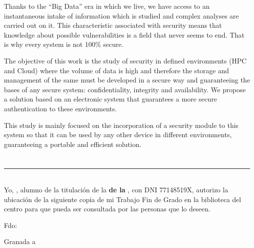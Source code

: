 Thanks to the ``Big Data'' era in which we live, we have access to an instantaneous intake of information which is studied and complex analyses are carried out on it. 
This characteristic associated with security means that knowledge about possible vulnerabilities is a field that never seems to end. That is why every system is not 100\% secure.

The objective of this work is the study of security in defined environments (HPC and Cloud) where the volume of data is high and therefore the storage and management of the same must be developed in a secure way and guaranteeing the bases of any secure system: confidentiality, integrity and availability.  We propose a solution based on an electronic system that guarantees a more secure authentication to these environments. 

This study is mainly focused on the incorporation of a security module to this system so that it can be used by any other device in different environments, guaranteeing a portable and efficient solution. 


\chapter*{}

\thispagestyle{empty}

\noindent\rule[-1ex]{\textwidth}{2pt}\\[4.5ex]

Yo, \textbf{\myName}, alumno de la titulación \myDegree de la \textbf{\myFaculty de la \myUni}, con DNI 77148519X, autorizo la
ubicación de la siguiente copia de mi Trabajo Fin de Grado en la biblioteca del centro para que pueda ser
consultada por las personas que lo deseen.

\vspace{6cm}

\noindent Fdo: \myName

\vspace{2cm}

\begin{flushright}
Granada a \myTime
\end{flushright}

\chapter*{}

\thispagestyle{empty}


